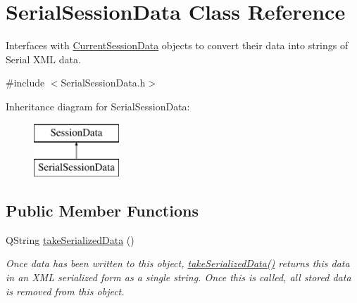 \hypertarget{class_serial_session_data}{\section{Serial\-Session\-Data Class Reference}
\label{class_serial_session_data}
}


Interfaces with \hyperlink{class_current_session_data}{Current\-Session\-Data} objects to convert their data into strings of Serial X\-M\-L data.  




{\ttfamily \#include $<$Serial\-Session\-Data.\-h$>$}

Inheritance diagram for Serial\-Session\-Data\-:\begin{figure}[H]
\begin{center}
\leavevmode
\includegraphics[height=2.000000cm]{class_serial_session_data}
\end{center}
\end{figure}
\subsection*{Public Member Functions}
\begin{DoxyCompactItemize}
\item 
\hypertarget{class_serial_session_data_adbd0b301805d06377ae635839419698f}{Q\-String \hyperlink{class_serial_session_data_adbd0b301805d06377ae635839419698f}{take\-Serialized\-Data} ()}\label{class_serial_session_data_adbd0b301805d06377ae635839419698f}

\begin{DoxyCompactList}\small\item\em Once data has been written to this object, \hyperlink{class_serial_session_data_adbd0b301805d06377ae635839419698f}{take\-Serialized\-Data()} returns this data in an X\-M\-L serialized form as a single string. Once this is called, all stored data is removed from this object. \end{DoxyCompactList}\end{DoxyCompactItemize}

